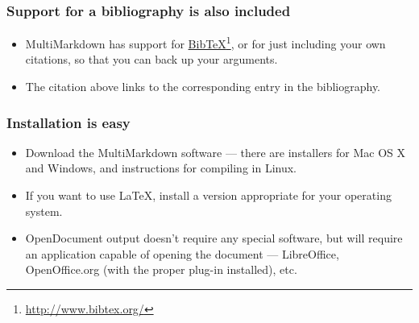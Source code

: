 \begin{frame}[fragile]
\frametitle{Support for a bibliography is also included }
\label{supportforabibliographyisalsoincluded}

\begin{itemize}
\item{} MultiMarkdown has support for \href{http://www.bibtex.org/}{BibTeX}\footnote{\href{http://www.bibtex.org/}{http:\slash \slash www.bibtex.org\slash }}, or
for just including your own citations, so that you can back up your
arguments.~\citep[p. 42]{fake}

\item{} The citation above links to the corresponding entry in the bibliography.

\end{itemize}

\end{frame}

\begin{frame}[fragile]
\frametitle{Installation is easy }
\label{installationiseasy}

\begin{itemize}
\item{} Download the MultiMarkdown software --- there are installers for Mac OS X
and Windows, and instructions for compiling in Linux.

\item{} If you want to use LaTeX, install a version appropriate for your operating
system.

\item{} OpenDocument output doesn't require any special software, but will require
an application capable of opening the document --- LibreOffice,
OpenOffice.org (with the proper plug-in installed), etc.

\end{itemize}

\end{frame}

